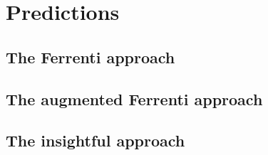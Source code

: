 \chapter{Predictions}

\section{The Ferrenti approach}



\section{The augmented Ferrenti approach}

\section{The insightful approach}

\begin{table}[!ht]
\centering
\caption{Table of the number of predictions made with the optimal model for the insightful approach. }
\label{tab:timing-extraction}
\noindent{}
\end{table}
